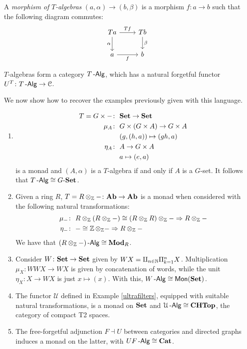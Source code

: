 \documentclass[a4paper,11pt,oneside,openany]{scrbook}
\begin{document}
\begin{defn}
	A \emph{morphism of $T$-algebras} $(a,\alpha)\rightarrow (b,\beta)$ is a morphism $f\colon a\rightarrow b$ such that the following diagram commutes:
	\[
		\begin{tikzcd}
			Ta\arrow["\alpha"']{d}\arrow["Tf"]{r}
			& Tb\arrow["\beta"]{d} \\
			a\arrow["f"']{r}
			& b
		\end{tikzcd}
	\]
\end{defn}


$T$-algebras form a category $T\operatorname{-\mathsf{Alg}}$, which has a natural forgetful functor $U^T\colon T\operatorname{-\mathsf{Alg}}\rightarrow\operatorname{\mathcal{C}}$.

We now show how to recover the examples previously given with this language.

\begin{exmp}
	\begin{enumerate}
		\item
		      \begin{align*}
			      T=G\times - \colon & \ {\normalfont\textbf{Set}} \rightarrow{\normalfont\textbf{Set}}                      \\
			      \mu_A\colon        & \ G\times (G\times A) \rightarrow G\times A \\
			                         & \ (g,(h,a)) \mapsto (gh,a)                  \\
			      \eta_A\colon       & \ A \rightarrow G\times A                   \\
			                         & \ a \mapsto (e,a)
		      \end{align*}
		      is a monad and $(A,\alpha)$ is a $T$-algebra if and only if $A$ is a $G$-set. It follows that $T\operatorname{-\mathsf{Alg}}\cong G\mbox{-}{\normalfont\textbf{Set}}$.
		\item Given a ring $R$, $T=R\otimes_{\operatorname{\mathbb{Z}}}-\colon {\normalfont\textbf{Ab}}\rightarrow {\normalfont\textbf{Ab}}$ is a monad when considered with the following natural transformations:
		      \begin{align*}
			      \mu_{-}\colon & \ R\otimes_{\Z}(R\otimes_{\Z}-)\cong (R\otimes_{\Z}R)\otimes_{\Z}-\Rightarrow R\otimes_{\Z}- \\
			      \eta_-\colon  & \ -\cong\Z\otimes_{\Z}-\Rightarrow R\otimes_{\Z}-
		      \end{align*}
		      We have that $(R\otimes_{\operatorname{\mathbb{Z}}}-)\operatorname{-\mathsf{Alg}}\cong{\normalfont\textbf{Mod}}_R$.
		\item Consider $W\colon{\normalfont\textbf{Set}}\rightarrow{\normalfont\textbf{Set}}$ given by $WX=\amalg_{n\in\operatorname{\mathbb{N}}}\Pi_{k=1}^n X$. Multiplication $\mu_X\colon WWX\rightarrow WX$ is given by concatenation of words, while the unit $\eta_X\colon X\rightarrow WX$ is just $x\mapsto (x)$. With this, $W\operatorname{-\mathsf{Alg}}\cong \operatorname{\mathsf{Mon}}({\normalfont\textbf{Set}})$.
		\item The functor $\mathcal{U}$ defined in Example \ref{ultrafilters}, equipped with suitable natural transformations, is a monad on ${\normalfont\textbf{Set}}$ and $\mathcal{U}\operatorname{-\mathsf{Alg}}\cong {\normalfont\textbf{CHTop}}$, the category of compact T2 spaces.
		\item The free-forgetful adjunction $F\dashv U$ between categories and directed graphs induces a monad on the latter, with $UF\operatorname{-\mathsf{Alg}}\cong{\normalfont\textbf{Cat}}$.
	\end{enumerate}
\end{exmp}
\end{document}

